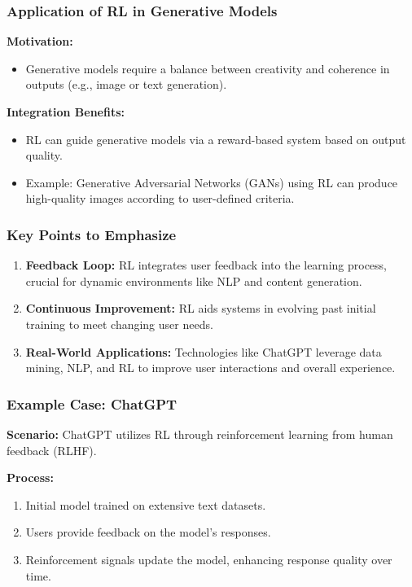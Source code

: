 \documentclass[aspectratio=169]{beamer}
\begin{document}
\begin{frame}[fragile]
    \frametitle{Application of RL in Generative Models}
    \textbf{Motivation:}
    \begin{itemize}
        \item Generative models require a balance between creativity and coherence in outputs (e.g., image or text generation).
    \end{itemize}
    
    \textbf{Integration Benefits:}
    \begin{itemize}
        \item RL can guide generative models via a reward-based system based on output quality.
        \item Example: Generative Adversarial Networks (GANs) using RL can produce high-quality images according to user-defined criteria.
    \end{itemize}
\end{frame}

\begin{frame}[fragile]
    \frametitle{Key Points to Emphasize}
    \begin{enumerate}
        \item \textbf{Feedback Loop:} RL integrates user feedback into the learning process, crucial for dynamic environments like NLP and content generation.
        \item \textbf{Continuous Improvement:} RL aids systems in evolving past initial training to meet changing user needs.
        \item \textbf{Real-World Applications:} Technologies like ChatGPT leverage data mining, NLP, and RL to improve user interactions and overall experience.
    \end{enumerate}
\end{frame}

\begin{frame}[fragile]
    \frametitle{Example Case: ChatGPT}
    \textbf{Scenario:} ChatGPT utilizes RL through reinforcement learning from human feedback (RLHF).
    
    \textbf{Process:}
    \begin{enumerate}
        \item Initial model trained on extensive text datasets.
        \item Users provide feedback on the model's responses.
        \item Reinforcement signals update the model, enhancing response quality over time.
    \end{enumerate}
\end{frame}
\end{document}
